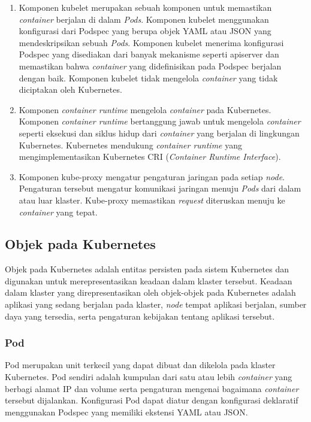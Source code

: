 \begin{enumerate}
  
  \item Komponen kubelet merupakan sebuah komponen untuk memastikan \emph{container} berjalan di dalam \emph{Pods}.
    Komponen kubelet menggunakan konfigurasi dari Podspec yang berupa objek YAML atau JSON yang mendeskripsikan
    sebuah \emph{Pods}. Komponen kubelet menerima konfigurasi Podspec yang disediakan dari banyak mekanisme seperti
    apiserver dan memastikan bahwa \emph{container} yang didefinisikan pada Podspec berjalan dengan baik. Komponen kubelet
    tidak mengelola \emph{container} yang tidak diciptakan oleh Kubernetes.

  \item Komponen \emph{container runtime} mengelola \emph{container} pada Kubernetes. Komponen \emph{container runtime}
    bertanggung jawab untuk mengelola \emph{container} seperti eksekusi dan siklus hidup dari \emph{container} yang berjalan
    di lingkungan Kubernetes. Kubernetes mendukung \emph{container runtime} yang mengimplementasikan Kubernetes
    CRI (\emph{Container Runtime Interface}).

  \item Komponen kube-proxy mengatur pengaturan jaringan pada setiap \emph{node}. Pengaturan tersebut mengatur komunikasi
    jaringan menuju \emph{Pods} dari dalam atau luar klaster. Kube-proxy memastikan \emph{request} diteruskan menuju ke
    \emph{container} yang tepat.

\end{enumerate}

\subsection{Objek pada Kubernetes}

Objek pada Kubernetes adalah entitas persisten pada sistem Kubernetes dan digunakan untuk
merepresentasikan keadaan dalam klaster tersebut. Keadaan dalam klaster yang direpresentasikan
oleh objek-objek pada Kubernetes adalah aplikasi yang sedang berjalan pada klaster, \emph{node}
tempat aplikasi berjalan, sumber daya yang tersedia, serta pengaturan kebijakan tentang aplikasi
tersebut.

\subsubsection{Pod}

Pod merupakan unit terkecil yang dapat dibuat dan dikelola pada klaster Kubernetes. Pod sendiri adalah
kumpulan dari satu atau lebih \emph{container} yang berbagi alamat IP dan volume serta
pengaturan mengenai bagaimana \emph{container} tersebut dijalankan. Konfigurasi Pod dapat
diatur dengan konfigurasi deklaratif menggunakan Podspec yang memiliki ekstensi YAML atau JSON.

